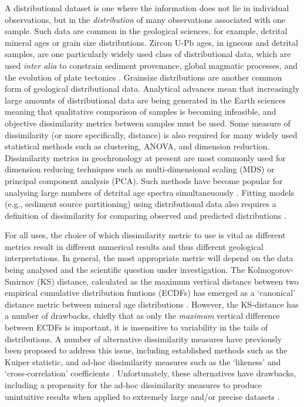 \documentclass[gchron, manuscript]{article}
\begin{document}
A distributional dataset is one where the information does not lie in individual observations, but in the \textit{distribution} of many observations associated with one sample. Such data are common in the geological sciences, for example, detrital mineral ages or grain size distributions. Zircon U-Pb ages, in igneous and detrital samples, are one particularly widely used class of distributional data, which are used \textit{inter alia} to constrain sediment provenance, global magmatic processes, and the evolution of plate tectonics \citep[e.g.,][]{condie_granitoid_2009,cawood_detrital_2012,reimink_global_2021}. Grainsize distributions are another common form of geological distributional data. Analytical advances mean that increasingly large amounts of distributional data are being generated in the Earth sciences meaning that qualitative comparison of samples is becoming infeasible, and objective dissimilarity metrics between samples must be used. Some measure of dissimilarity (or more specifically, distance) is also required for many widely used statistical methods such as clustering, ANOVA, and dimension reduction. Dissimilarity metrics in geochronology at present are most commonly used for dimension reducing techniques such as multi-dimensional scaling (MDS) or principal component analysis (PCA). Such methods have become popular for analysing large numbers of detrital age spectra simultaneuously \citep{vermeesch_multi-sample_2013,sharman_detritalpy_2018,vermeesch_dissimilarity_2018}. Fitting models (e.g., sediment source partitioning) using distributional data also requires a definition of dissimilarity for comparing observed and predicted distributions \citep[e.g.,][]{amidon_construction_2005,de_doncker_inversion_2020}. 

For all uses, the choice of which dissimilarity metric to use is vital as different metrics result in different numerical results and thus different geological interpretations. In general, the most appropriate metric will depend on the data being analysed and the scientific question under investigation. The Kolmogorov-Smirnov (KS) distance, calculated as the maximum vertical distance between two empirical cumulative distribution funtions (ECDFs) has emerged as a `canonical' distance metric between mineral age distributions \citep{berry_north_2001,vermeesch_dissimilarity_2018}. However, the KS-distance has a number of drawbacks, chiefly that as only the \textit{maximum} vertical difference between ECDFs is important, it is insensitive to variability in the tails of distributions. A number of alternative dissimilarity measures have previously been proposed to address this issue, including established methods such as the Kuiper statistic, and ad-hoc dissimilarity measures such as the `likeness' and `cross-correlation' coefficients \citep{satkoski_likeness_2013,saylor_discriminating_2012}. Unfortunately, these alternatives have drawbacks, including a propensity for the ad-hoc dissimilarity measures to produce unintuitive results when applied to extremely large and/or precise datasets \citep{vermeesch_dissimilarity_2018}.
\end{document}
